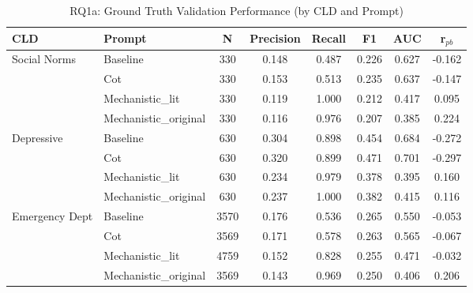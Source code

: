 \begin{table}[htbp]
\centreing
\caption{RQ1a: Ground Truth Validation Performance (by CLD and Prompt)}
\label{tab:rq1a_gt_main}
\begin{tabular}{llcccccc}
\toprule
\textbf{CLD} & \textbf{Prompt} & \textbf{N} & \textbf{Precision} & \textbf{Recall} & \textbf{F1} & \textbf{AUC} & \textbf{r$_{pb}$} \\
\midrule
Social Norms & Baseline & 330 & 0.148 & 0.487 & 0.226 & 0.627 & -0.162 \\
 & Cot & 330 & 0.153 & 0.513 & 0.235 & 0.637 & -0.147 \\
 & Mechanistic_lit & 330 & 0.119 & 1.000 & 0.212 & 0.417 & 0.095 \\
 & Mechanistic_original & 330 & 0.116 & 0.976 & 0.207 & 0.385 & 0.224 \\
\midrule
Depressive & Baseline & 630 & 0.304 & 0.898 & 0.454 & 0.684 & -0.272 \\
 & Cot & 630 & 0.320 & 0.899 & 0.471 & 0.701 & -0.297 \\
 & Mechanistic_lit & 630 & 0.234 & 0.979 & 0.378 & 0.395 & 0.160 \\
 & Mechanistic_original & 630 & 0.237 & 1.000 & 0.382 & 0.415 & 0.116 \\
\midrule
Emergency Dept & Baseline & 3570 & 0.176 & 0.536 & 0.265 & 0.550 & -0.053 \\
 & Cot & 3569 & 0.171 & 0.578 & 0.263 & 0.565 & -0.067 \\
 & Mechanistic_lit & 4759 & 0.152 & 0.828 & 0.255 & 0.471 & -0.032 \\
 & Mechanistic_original & 3569 & 0.143 & 0.969 & 0.250 & 0.406 & 0.206 \\
\midrule
\bottomrule
\end{tabular}
\end{table}